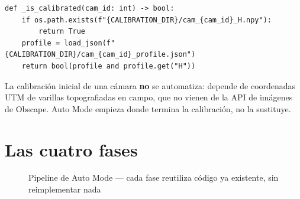 \begin{codebox}
\begin{verbatim}
def _is_calibrated(cam_id: int) -> bool:
    if os.path.exists(f"{CALIBRATION_DIR}/cam_{cam_id}_H.npy"):
        return True
    profile = load_json(f"{CALIBRATION_DIR}/cam_{cam_id}_profile.json")
    return bool(profile and profile.get("H"))
\end{verbatim}
\end{codebox}

La calibración inicial de una cámara \textbf{no} se automatiza: depende de coordenadas UTM de
varillas topografiadas en campo, que no vienen de la API de imágenes de Obscape. Auto Mode
empieza donde termina la calibración, no la sustituye.

\section{Las cuatro fases}

\begin{figure}[H]
\centering
\caption{Pipeline de Auto Mode --- cada fase reutiliza código ya existente, sin reimplementar nada}
\label{fig:automode-pipeline}
\end{figure}

